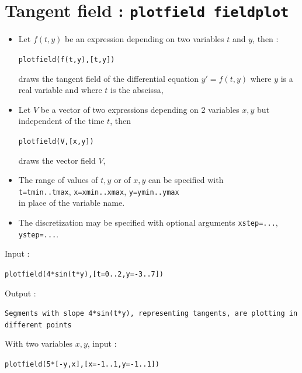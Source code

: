 \documentclass[a4paper,11pt]{book}
\begin{document}
\section{Tangent field : {\tt plotfield fieldplot}}
\begin{itemize}
\item Let $f(t,y)$ be an expression depending on two variables $t$ and $y$, 
then :
\begin{center}
{\tt plotfield(f(t,y),[t,y])}
\end{center} 
draws the tangent field of the 
differential equation $y'=f(t,y)$ where $y$ is a real variable and
where $t$ is the abscissa,
\item Let $V$ be 
a vector of two expressions depending on 2 variables $x,y$ but 
independent of the time $t$, then 
\begin{center}
{\tt plotfield(V,[x,y])}
\end{center}
draws the vector field $V$,
\item The range of values of $t,y$ or of $x,y$ can be specified with\\
{\tt t=tmin..tmax}, {\tt x=xmin..xmax}, {\tt y=ymin..ymax}\\
in place of the variable name.
\item The discretization may be specified with optional
arguments {\tt xstep=...}, {\tt ystep=...}.
\end{itemize}
Input :
\begin{center}{\tt plotfield(4*sin(t*y),[t=0..2,y=-3..7]) }\end{center}
Output :
\begin{center}{\tt Segments with slope 4*sin(t*y), representing tangents, are plotting in different points}\end{center}
With two variables $x,y$, input :
\begin{center}
{\tt plotfield(5*[-y,x],[x=-1..1,y=-1..1]) }
\end{center}
\end{document}
